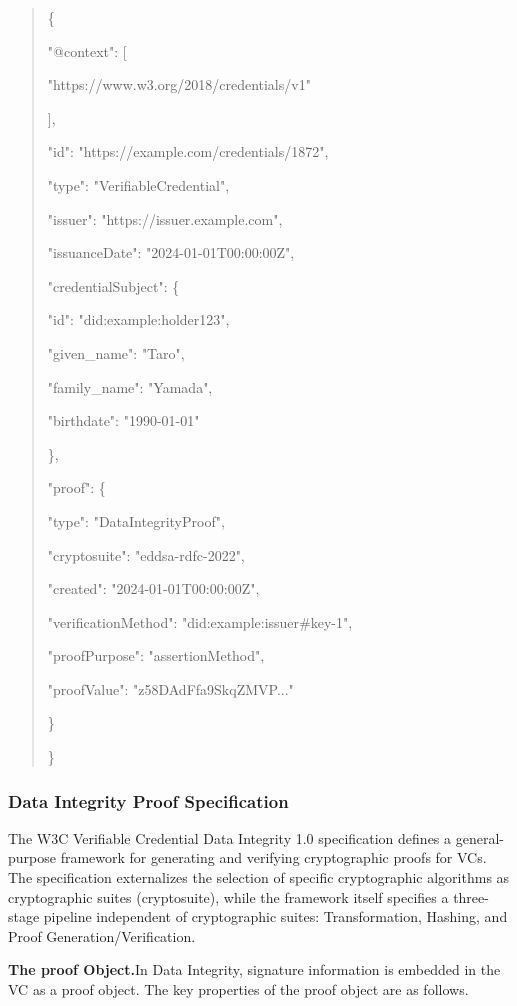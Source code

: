 \documentclass[conference]{IEEEtran}
\begin{document}
\begin{quote}
\{

"@context": {[}

"https://www.w3.org/2018/credentials/v1"

{]},

"id": "https://example.com/credentials/1872",

"type": "VerifiableCredential",

"issuer": "https://issuer.example.com",

"issuanceDate": "2024-01-01T00:00:00Z",

"credentialSubject": \{

"id": "did:example:holder123",

"given\_name": "Taro",

"family\_name": "Yamada",

"birthdate": "1990-01-01"

\},

"proof": \{

"type": "DataIntegrityProof",

"cryptosuite": "eddsa-rdfc-2022",

"created": "2024-01-01T00:00:00Z",

"verificationMethod": "did:example:issuer\#key-1",

"proofPurpose": "assertionMethod",

"proofValue": "z58DAdFfa9SkqZMVP..."

\}

\}
\end{quote}

\subsubsection{Data Integrity Proof Specification}

The W3C Verifiable Credential Data Integrity 1.0 specification \cite{ref10} defines a general-purpose framework for generating and verifying cryptographic proofs for VCs. The specification externalizes the selection of specific cryptographic algorithms as cryptographic suites (cryptosuite), while the framework itself specifies a three-stage pipeline independent of cryptographic suites: Transformation, Hashing, and Proof Generation/Verification.

\textbf{The proof Object.}In Data Integrity, signature information is embedded in the VC as a proof object. The key properties of the proof object are as follows.
\end{document}
